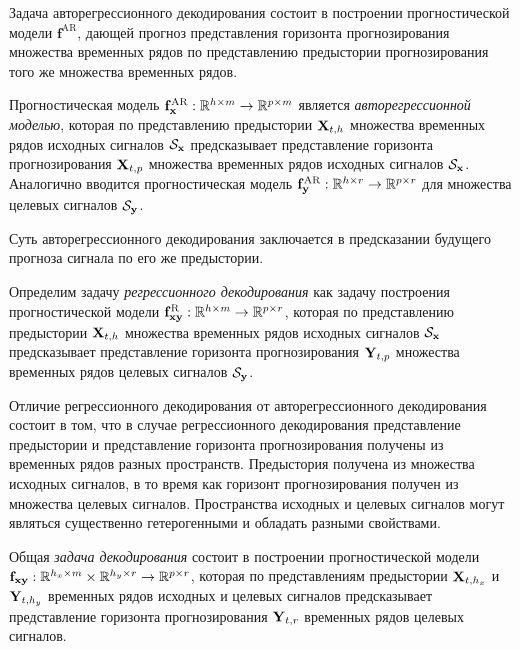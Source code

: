 Задача авторегрессионного декодирования состоит в построении прогностической модели $\mathbf{f}^{\text{AR}}$, дающей прогноз представления горизонта прогнозирования множества временных рядов по представлению предыстории прогнозирования того же множества временных рядов.

\begin{definition}
	\label{ch1:def:autoreg_model}
	Прогностическая модель $\mathbf{f}^{\text{AR}}_{\mathbf{x}}: \mathbb{R}^{h \times m} \rightarrow \mathbb{R}^{p \times m}$ является \textit{авторегрессионной моделью}, которая по представлению предыстории $\mathbf{X}_{t,h}$ множества временных рядов исходных сигналов $\mathcal{S}_{\mathbf{x}}$ предсказывает представление горизонта прогнозирования $\mathbf{X}_{t,p}$ множества временных рядов исходных сигналов $\mathcal{S}_{\mathbf{x}}$.
	Аналогично вводится прогностическая модель $\mathbf{f}^{\text{AR}}_{\mathbf{y}}: \mathbb{R}^{h \times r} \rightarrow \mathbb{R}^{p \times r}$ для множества целевых сигналов $\mathcal{S}_{\mathbf{y}}$.
\end{definition}
Суть авторегрессионного декодирования заключается в предсказании будущего прогноза сигнала по его же предыстории.

\begin{definition}
	\label{ch1:def:reg_model}
	Определим задачу \textit{регрессионного декодирования} как задачу построения прогностической модели $\mathbf{f}^{\text{R}}_{\mathbf{x}\mathbf{y}}: \mathbb{R}^{h \times m} \rightarrow \mathbb{R}^{p \times r}$, которая по представлению предыстории $\mathbf{X}_{t,h}$ множества временных рядов исходных сигналов $\mathcal{S}_{\mathbf{x}}$ предсказывает представление горизонта прогнозирования $\mathbf{Y}_{t,p}$ множества временных рядов целевых сигналов $\mathcal{S}_{\mathbf{y}}$.
\end{definition}

Отличие регрессионного декодирования от авторегрессионного декодирования состоит в том, что в случае регрессионного декодирования представление предыстории и представление горизонта прогнозирования получены из временных рядов разных пространств. 
Предыстория получена из множества исходных сигналов, в то время как горизонт прогнозирования получен из множества целевых сигналов. 
Пространства исходных и целевых сигналов могут являться существенно гетерогенными и обладать разными свойствами.

\begin{definition}
	\label{ch1:def:decode_model}
	Общая \textit{задача декодирования} состоит в построении прогностической модели $\mathbf{f}_{\mathbf{x}\mathbf{y}}: \mathbb{R}^{h_x \times m} \times \mathbb{R}^{h_y \times r} \rightarrow \mathbb{R}^{p \times r}$, которая по представлениям предыстории $\mathbf{X}_{t,h_x}$ и $\mathbf{Y}_{t,h_y}$ временных рядов исходных и целевых сигналов предсказывает представление горизонта прогнозирования $\mathbf{Y}_{t,r}$ временных рядов целевых сигналов. 
\end{definition}

